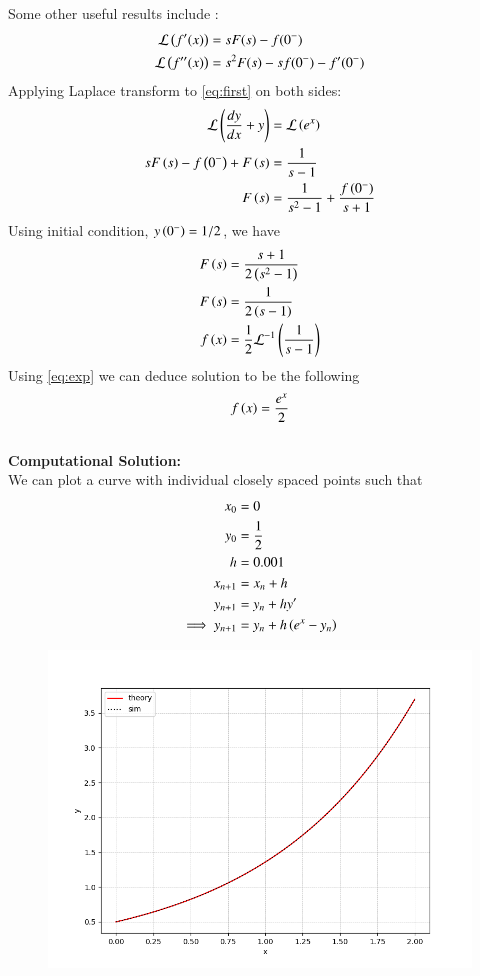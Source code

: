 \documentclass[journal,12pt,onecolumn]{IEEEtran}
\theoremstyle{remark}
\begin{document}
Some other useful results include :
		\begin{align}
			\mathcal{L} \left(f^{\prime}(x)\right) &= s F(s) - f(0^{-}) \\
			\mathcal{L} \left(f^{\prime \prime}(x)\right) &= s^2 F(s) - s f(0^{-}) - f^{\prime}(0^{-}) 
		\end{align}
Applying Laplace transform to \eqref{eq:first} on both sides:\\
\begin{align}	
    \mathcal{L}\left(\frac{dy}{dx}+y\right)&=\mathcal{L}\left(e^x\right)\\
    sF\left(s\right)-f\left(0^-\right)+F\left(s\right)&=\frac{1}{s-1}\\
    F\left(s\right)&=\frac{1}{s^2-1}+\frac{f\left(0^-\right)}{s+1}
\end{align}
Using initial condition, $y\left(0^-\right)=1/2$, we have
\begin{align}
    F\left(s\right)&=\frac{s+1}{2\left(s^2-1\right)}\\
    F\left(s\right)&=\frac{1}{2\left(s-1\right)}\\
    f\left(x\right)&=\frac{1}{2}\mathcal{L}^{-1}\left(\frac{1}{s-1}\right)
\end{align}
Using \eqref{eq:exp} we can deduce solution to be the following
\begin{align}
    f\left(x\right)=\frac{e^x}{2}
\end{align}
\\
\textbf{Computational Solution:}\\
We can plot a curve with individual closely spaced points such that
\begin{align}
    x_0&=0\\
    y_0&=\frac{1}{2}\\
    h&=0.001\\
    x_{n+1}&=x_{n}+h\\
    y_{n+1}&=y_n+hy^\prime\\
    \implies y_{n+1}&=y_n+h\left(e^x-y_n\right)
\end{align}
\begin{figure}[h]
    \centering
    \includegraphics[width=\columnwidth]{figs/fig.png}
 \end{figure}
\end{document}
